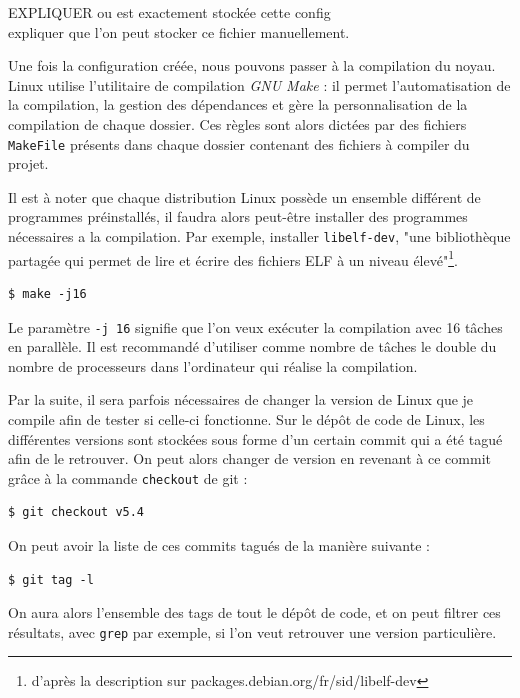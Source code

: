 \begin{center}
    \color{red}
    EXPLIQUER ou est exactement stockée cette config \\
expliquer que l'on peut stocker ce fichier manuellement.
\end{center}


Une fois la configuration créée, nous pouvons passer à la compilation du noyau. Linux utilise l'utilitaire de compilation \textit{GNU Make} : il permet l'automatisation de la compilation, la gestion des dépendances et gère la personnalisation de la compilation de chaque dossier. Ces règles sont alors dictées par des fichiers \texttt{MakeFile} présents dans chaque dossier contenant des fichiers à compiler du projet.

Il est à noter que chaque distribution Linux possède un ensemble différent de programmes préinstallés, il faudra alors peut-être installer des programmes nécessaires a la compilation. Par exemple, installer \texttt{libelf-dev}, "une bibliothèque partagée qui permet de lire et écrire des fichiers ELF à un niveau élevé"\footnote{d'après la description sur packages.debian.org/fr/sid/libelf-dev}. 

\begin{lstlisting}[style=command, caption=Compilation sur plusieurs processeurs] 
$ make -j16
\end{lstlisting}

Le paramètre \texttt{-j 16} signifie que l'on veux exécuter la compilation avec 16 tâches en parallèle. Il est recommandé d'utiliser comme nombre de tâches le double du nombre de processeurs dans l'ordinateur qui réalise la compilation.

Par la suite, il sera parfois nécessaires de changer la version de Linux que je compile afin de tester si celle-ci fonctionne. Sur le dépôt de code de Linux, les différentes versions sont stockées sous forme d'un certain commit qui a été tagué afin de le retrouver. On peut alors changer de version en revenant à ce commit grâce à la commande \texttt{checkout} de \gls{git} : 
\begin{lstlisting}[style=command, caption=Retour sur un commit tagé]
$ git checkout v5.4
\end{lstlisting}
On peut avoir la liste de ces commits tagués de la manière suivante : 
\begin{lstlisting}[style=command, caption=Comment lister les tags]
$ git tag -l
\end{lstlisting}
On aura alors l'ensemble des tags de tout le dépôt de code, et on peut filtrer ces résultats, avec \texttt{grep} par exemple, si l'on veut retrouver une version particulière.

